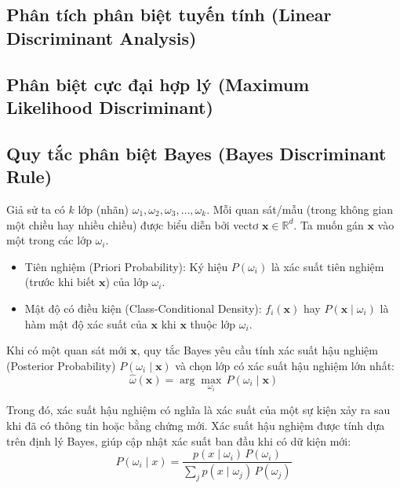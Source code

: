 \documentclass[
  a4paper,
]{article}
\providecommand{\tightlist}{%
  \setlength{\itemsep}{0pt}\setlength{\parskip}{0pt}}
\begin{document}
\subsection{Phân tích phân biệt tuyến tính (Linear Discriminant
Analysis)}\label{phuxe2n-tuxedch-phuxe2n-biux1ec7t-tuyux1ebfn-tuxednh-linear-discriminant-analysis}


\subsection{Phân biệt cực đại hợp lý (Maximum Likelihood
Discriminant)}\label{phuxe2n-biux1ec7t-cux1ef1c-ux111ux1ea1i-hux1ee3p-luxfd-maximum-likelihood-discriminant}


\subsection{Quy tắc phân biệt Bayes (Bayes Discriminant
Rule)}\label{quy-tux1eafc-phuxe2n-biux1ec7t-bayes-bayes-discriminant-rule}

Giả sử ta có \(k\) lớp (nhãn)
\(\omega_1, \omega_2, \omega_3, \dots, \omega_k\). Mỗi quan sát/mẫu
(trong không gian một chiều hay nhiều chiều) được biểu diễn bởi vectơ
\(\mathbf{x} \in \mathbb{R}^d\). Ta muốn gán \(\mathbf{x}\) vào một
trong các lớp \(\omega_i\).

\begin{itemize}
\tightlist
\item
  Tiên nghiệm (Priori Probability): Ký hiệu \(P(\omega_i)\) là xác suất
  tiên nghiệm (trước khi biết \(\mathbf{x}\)) của lớp \(\omega_i\).
\item
  Mật độ có điều kiện (Class-Conditional Density): \(f_i(\mathbf{x})\)
  hay \(P(\mathbf{x} \mid \omega_i)\) là hàm mật độ xác suất của
  \(\mathbf{x}\) khi \(\mathbf{x}\) thuộc lớp \(\omega_i\).
\end{itemize}

Khi có một quan sát mới \(\mathbf{x}\), quy tắc Bayes yêu cầu tính xác
suất hậu nghiệm (Posterior Probability) \(P(\omega_i \mid \mathbf{x})\)
và chọn lớp có xác suất hậu nghiệm lớn nhất: \[\hat{\omega}(\mathbf{x})
= \arg\max_{\omega_i} \, P(\omega_i \mid \mathbf{x})\]

Trong đó, xác suất hậu nghiệm có nghĩa là xác suất của một sự kiện xảy
ra sau khi đã có thông tin hoặc bằng chứng mới. Xác suất hậu nghiệm được
tính dựa trên định lý Bayes, giúp cập nhật xác suất ban đầu khi có dữ
kiện mới: \[P(\omega_i \mid x)
= \frac{p(x \mid \omega_i)\,P(\omega_i)}
       {\sum_{j} p(x \mid \omega_j)\,P(\omega_j)}\]
\end{document}
